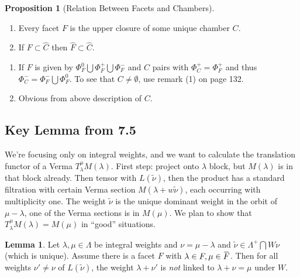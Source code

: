 \documentclass[11pt]{scrartcl}
\theoremstyle{definition}
\theoremstyle{theorem}
\newtheorem{proposition}[theorem]{Proposition}
\newtheorem{lemma}[theorem]{Lemma}
\theoremstyle{proof}
\newenvironment{proof}
{\pushQED{$\qed$}\pf}
{\par\popQED\endpf}
\theoremstyle{definition}
\theoremstyle{break}
\theoremstyle{problem}
\providecommand{\tightlist}{%
  \setlength{\itemsep}{0pt}\setlength{\parskip}{0pt}}
\newcommand{\intersect}[0]{\bigcap}
\newcommand{\union}[0]{\bigcup}
\renewcommand{\bar}[1]{\mkern 1.5mu\overline{\mkern-1.5mu#1\mkern-1.5mu}\mkern 1.5mu}
\renewcommand{\hat}[1]{\widehat{#1}}
\renewcommand{\qed}[0]{\hfill\blacksquare}
\begin{document}
\begin{proposition}[Relation Between Facets and Chambers]

\hfill

\begin{enumerate}
\def\labelenumi{\alph{enumi}.}
\tightlist
\item
  Every facet \(F\) is the upper closure of some unique chamber \(C\).
\item
  If \(F \subset \hat C\) then \(\hat F \subset \hat C\).
\end{enumerate}

\end{proposition}

\begin{proof}

\hfill

\begin{enumerate}
\def\labelenumi{\alph{enumi}.}
\tightlist
\item
  If \(F\) is given by \(\Phi_F^0 \union \Phi_F^+ \union \Phi_F^-\) and
  \(C\) pairs with \(\Phi_C^+ = \Phi_F^+\) and thus
  \(\Phi_C^- = \Phi_F^- \union \Phi_F^0\). To see that
  \(C\neq \emptyset\), use remark (1) on page 132.
\item
  Obvious from above description of \(C\).
\end{enumerate}

\end{proof}

\hypertarget{key-lemma-from-7.5}{%
\subsection{Key Lemma from 7.5}\label{key-lemma-from-7.5}}

We're focusing only on integral weights, and we want to calculate the
translation functor of a Verma \(T_\lambda^\mu M(\lambda)\). First step:
project onto \(\lambda\) block, but \(M(\lambda)\) is in that block
already. Then tensor with \(L(\tilde \nu)\), then the product has a
standard filtration with certain Verma section
\(M(\lambda + w\tilde \nu)\), each occurring with multiplicity one. The
weight \(\tilde \nu\) is the unique dominant weight in the orbit of
\(\mu - \lambda\), one of the Verma sections is in \(M(\mu)\). We plan
to show that \(T_\lambda^\mu M(\lambda) = M(\mu)\) in ``good''
situations.

\begin{lemma}

Let \(\lambda, \mu \in \Lambda\) be integral weights and
\(\nu = \mu - \lambda\) and
\(\tilde \nu \in \Lambda^+ \intersect W \nu\) (which is unique). Assume
there is a facet \(F\) with \(\lambda \in F, \mu \in \bar F\). Then for
all weights \(\nu' \neq \nu\) of \(L(\tilde\nu)\), the weight
\(\lambda + \nu'\) is \emph{not} linked to \(\lambda + \nu = \mu\) under
\(W\).\end{lemma}
\end{document}
